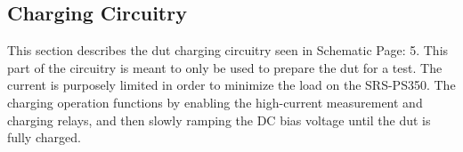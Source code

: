 \subsection{Charging Circuitry}
\label{sec:charging}

This section describes the \gls{dut} charging circuitry seen in Schematic Page: 5. This part of the circuitry is meant to only be used to prepare the \gls{dut} for a test. The current is purposely limited in order to minimize the load on the SRS-PS350. The charging operation functions by enabling the high-current measurement and charging relays, and then slowly ramping the DC bias voltage until the \gls{dut} is fully charged.

